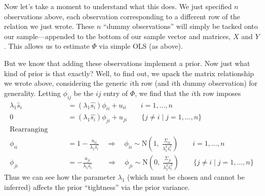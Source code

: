 \documentclass[12pt]{article}
\theoremstyle{plain}
\theoremstyle{definition}
\theoremstyle{remark}
\begin{document}
\begin{enumerate}
	Now let's take a moment to understand what this does.
	We just specified $n$ observations above, each
	observation corresponding to a different row of the
	relation we just wrote.  These $n$ ``dummy observations''
	will simply be tacked onto our sample---appended to the
	bottom of our sample vector and matrices, $X$ and $Y$.
	This allows us to estimate $\Phi$ via simple OLS (as
	above).

	But we know that adding these observations implement
	a prior. Now just what kind of prior is that exactly?
	Well, to find out, we upack the matrix relationship
	we wrote above, considering the generic $i$th row
	(and $i$th dummy observation) for generality.
	Letting $\phi_{ij}$ be the $ij$ entry of $\Phi$, we
	find that the $i$th row imposes
	\begin{align*}
	    \lambda_1 \hat{s}_i &= \left(\lambda_1
	    \hat{s_i}\right) \phi_{ii} + u_{ii}
	    \qquad i=1,\ldots, n \\
	    0 &= \left(\lambda_1
	    \hat{s_i}\right) \phi_{ji} + u_{ji}
	    \qquad \{ j \neq i \; | \; j = 1, \ldots, n\} \\
	\text{Rearranging} \qquad & \\
	    \phi_{ii} &= 1-\frac{u_{ii}}{\lambda_1 \hat{s_i}}
	    \quad \Rightarrow \quad \phi_{ii} \sim
	    \text{N}\left(1, \; \frac{\Sigma_{ii}}{
	    \lambda_1^2 \hat{s}_i^2 }\right)
	    \qquad i = 1, \ldots, n \\
	    \phi_{ji} &= -\frac{u_{ji}}{\lambda_1 \hat{s_i}}
	    \qquad \Rightarrow \quad \phi_{ji} \sim
	    \text{N}\left(0, \; \frac{\Sigma_{ji}}{
	    \lambda_1^2 \hat{s}_i^2 }\right)
	    \qquad \{ j \neq i \; | \; j = 1, \ldots, n\}
	\end{align*}
	Thus we can see how the parameter $\lambda_1$ (which
	must be chosen and cannot be inferred) affects the
	prior ``tightness'' via the prior variance.


\end{enumerate}
\end{document}
